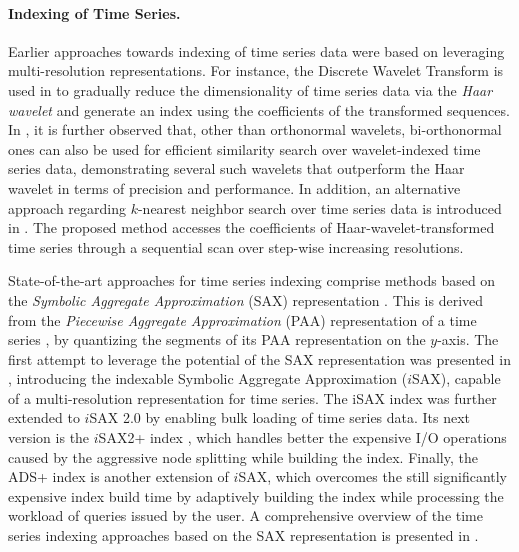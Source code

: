 \paragraph{Indexing of Time Series.} Earlier approaches towards indexing of time series data were based on leveraging multi-resolution representations. For instance, the Discrete Wavelet Transform \cite{graps1995cse} is used in \cite{chan1999icde} to gradually reduce the dimensionality of time series data via the \emph{Haar wavelet} \cite{haar1910theorie} and generate an index using the coefficients of the transformed sequences. In \cite{popivanov2002icde}, it is further observed that, other than orthonormal wavelets, bi-orthonormal ones can also be used for efficient similarity search over wavelet-indexed time series data, demonstrating several such wavelets that outperform the Haar wavelet in terms of precision and performance. In addition, an alternative approach regarding $k$-nearest neighbor search over time series data is introduced in \cite{kashyap2011kdd}. The proposed method accesses the coefficients of Haar-wavelet-transformed time series through a sequential scan over step-wise increasing resolutions.

State-of-the-art approaches for time series indexing comprise methods based on the {\em Symbolic Aggregate Approximation} (SAX) representation \cite{jessica2007dmkd}. This is derived from the {\em Piecewise Aggregate Approximation} (PAA) representation of a time series \cite{keogh2001paa,faloutsos2000vldb}, by quantizing the segments of its PAA representation on the $y$-axis. The first attempt to leverage the potential of the SAX representation was presented in \cite{shieh2008kdd}, introducing the indexable Symbolic Aggregate Approximation ($i$SAX), capable of a multi-resolution representation for time series. The iSAX index was further extended to $i$SAX 2.0  \cite{camerra2010icdm} by enabling bulk loading of time series data. Its next version is the $i$SAX2+ index \cite{camerra2014kais}, which handles better the expensive I/O operations caused by the aggressive node splitting while building the index. Finally, the ADS+ index \cite{zoumpatianos2014sigmod} is another extension of $i$SAX, which overcomes the still significantly expensive index build time by adaptively building the index while processing the workload of queries issued by the user. A comprehensive overview of the time series indexing approaches based on the SAX representation is presented in \cite{palpanas2016bigsm}.

